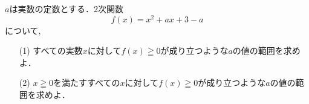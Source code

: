 \documentclass[8pt,dvipdfmx]{article}
\begin{document}
\begin{tcolorbox}[title=数学\textcircled{1} 2- 3 ABC ]
\(a\)は実数の定数とする．2次関数
\[f(x) = x^2 +ax +3 -a\]
について,
\begin{enumerate}
\item[(1)] すべての実数\(x\)に対して$f(x) \geqq 0$が成り立つような\(a\)の値の範囲を求めよ．
    \vspace{2mm} %
    \item[(2)] $x \geqq 0$を満たすすべての\(x\)に対して$f(x) \geqq 0$が成り立つような\(a\)の値の範囲を求めよ．
\end{enumerate}
\end{tcolorbox}



\end{document}
